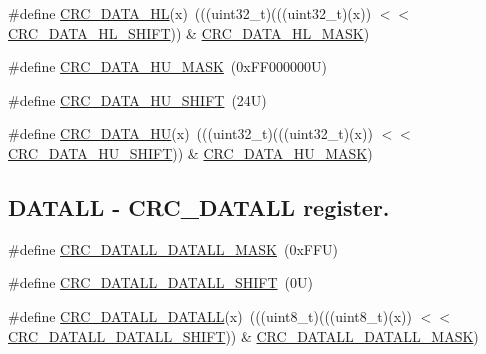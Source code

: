 \begin{DoxyCompactItemize}
\#define \mbox{\hyperlink{group___c_r_c___register___masks_gab48aad72696d318bf010c7e0c54cc95b}{C\+R\+C\+\_\+\+D\+A\+T\+A\+\_\+\+HL}}(x)~(((uint32\+\_\+t)(((uint32\+\_\+t)(x)) $<$$<$ \mbox{\hyperlink{group___c_r_c___register___masks_gae717e6022d6dd5e4e72cc3386e7ccc6b}{C\+R\+C\+\_\+\+D\+A\+T\+A\+\_\+\+H\+L\+\_\+\+S\+H\+I\+FT}})) \& \mbox{\hyperlink{group___c_r_c___register___masks_ga4d36f0e2640b258579276ada9dbc68b1}{C\+R\+C\+\_\+\+D\+A\+T\+A\+\_\+\+H\+L\+\_\+\+M\+A\+SK}})
\item 
\#define \mbox{\hyperlink{group___c_r_c___register___masks_ga30fc9246793f0817a1907bc0f9080487}{C\+R\+C\+\_\+\+D\+A\+T\+A\+\_\+\+H\+U\+\_\+\+M\+A\+SK}}~(0x\+F\+F000000\+U)
\item 
\#define \mbox{\hyperlink{group___c_r_c___register___masks_ga0b68b41e3667c6904623c59fcd3d6c62}{C\+R\+C\+\_\+\+D\+A\+T\+A\+\_\+\+H\+U\+\_\+\+S\+H\+I\+FT}}~(24\+U)
\item 
\#define \mbox{\hyperlink{group___c_r_c___register___masks_ga618e11d84c3e51f8d767a021dbfc4e94}{C\+R\+C\+\_\+\+D\+A\+T\+A\+\_\+\+HU}}(x)~(((uint32\+\_\+t)(((uint32\+\_\+t)(x)) $<$$<$ \mbox{\hyperlink{group___c_r_c___register___masks_ga0b68b41e3667c6904623c59fcd3d6c62}{C\+R\+C\+\_\+\+D\+A\+T\+A\+\_\+\+H\+U\+\_\+\+S\+H\+I\+FT}})) \& \mbox{\hyperlink{group___c_r_c___register___masks_ga30fc9246793f0817a1907bc0f9080487}{C\+R\+C\+\_\+\+D\+A\+T\+A\+\_\+\+H\+U\+\_\+\+M\+A\+SK}})
\end{DoxyCompactItemize}
\subsection*{D\+A\+T\+A\+LL -\/ C\+R\+C\+\_\+\+D\+A\+T\+A\+LL register.}
\begin{DoxyCompactItemize}
\item 
\#define \mbox{\hyperlink{group___c_r_c___register___masks_ga7f99e19de9e3e19206c47c202c96bb5c}{C\+R\+C\+\_\+\+D\+A\+T\+A\+L\+L\+\_\+\+D\+A\+T\+A\+L\+L\+\_\+\+M\+A\+SK}}~(0x\+F\+F\+U)
\item 
\#define \mbox{\hyperlink{group___c_r_c___register___masks_ga16cc13b7d931b2080c8de506cae34fcb}{C\+R\+C\+\_\+\+D\+A\+T\+A\+L\+L\+\_\+\+D\+A\+T\+A\+L\+L\+\_\+\+S\+H\+I\+FT}}~(0\+U)
\item 
\#define \mbox{\hyperlink{group___c_r_c___register___masks_ga92ae41280f6cede9a6d61d944b9bdbed}{C\+R\+C\+\_\+\+D\+A\+T\+A\+L\+L\+\_\+\+D\+A\+T\+A\+LL}}(x)~(((uint8\+\_\+t)(((uint8\+\_\+t)(x)) $<$$<$ \mbox{\hyperlink{group___c_r_c___register___masks_ga16cc13b7d931b2080c8de506cae34fcb}{C\+R\+C\+\_\+\+D\+A\+T\+A\+L\+L\+\_\+\+D\+A\+T\+A\+L\+L\+\_\+\+S\+H\+I\+FT}})) \& \mbox{\hyperlink{group___c_r_c___register___masks_ga7f99e19de9e3e19206c47c202c96bb5c}{C\+R\+C\+\_\+\+D\+A\+T\+A\+L\+L\+\_\+\+D\+A\+T\+A\+L\+L\+\_\+\+M\+A\+SK}})
\end{DoxyCompactItemize}
